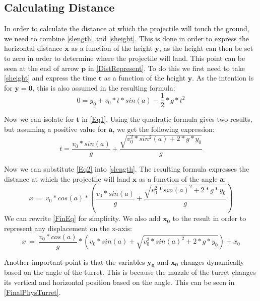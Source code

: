\subsection{Calculating Distance}\label{CalcDist}
In order to calculate the distance at which the projectile will touch the
ground, we need to combine \autoref{slength} and \autoref{sheight}. This is done in
order to express the horizontal distance $\mathbf{x}$ as a function of the
height $\mathbf{y}$, as the height can then be set to zero in order to determine
where the projectile will land. This point can be seen at the end of
arrow $\mathbf{p}$ in \autoref{DistRepresent}. To do this we first need to take
\autoref{sheight} and express the time $\mathbf{t}$ as a function of the height
$\mathbf{y}$. As the intention is for $\mathbf{y=0}$, this is also assumed in
the resulting formula:
\begin{equation}\label{Eq1}
0=y_0+v_0*t*sin(a)-\frac{1}{2}*g*t^2
\end{equation}

Now we can isolate for $\mathbf{t}$ in \autoref{Eq1}. Using the quadratic
formula gives two results, but assuming a positive value for $\mathbf{a}$, we
get the following expression:
\begin{equation}\label{Eq2}
t=\frac{v_0*sin(a)}{g}+\frac{\sqrt{v_0^2*sin^2(a)+2*g*y_0}}{g}
\end{equation}

Now we can substitute \autoref{Eq2} into \autoref{slength}. The resulting
formula expresses the distance at which the projectile will land $\mathbf{x}$ as
a function of the angle $\mathbf{a}$:
\begin{equation}\label{FinEq}
x\ =\ v_0*cos(a)* \left(\frac{v_0*sin(a)}{g} + \frac{
\sqrt{v_0^2*sin(a)^2+2*g*y_0}}{g}\right)
\end{equation}
We can rewrite \autoref{FinEq} for simplicity. We also add $\mathbf{x_0}$ to
the result in order to represent any displacement on the x-axis:
\begin{equation}\label{FinEq2}
x\ =\ \frac{v_0*cos(a)}{g}* \left(
v_0*sin(a)+\sqrt{v_0^2*sin(a)^2+2*g*y_0}\right)+x_0
\end{equation}

Another important point is that the variables $\mathbf{y_0}$ and $\mathbf{x_0}$
changes dynamically based on the angle of the turret. This is because the muzzle
of the turret changes its vertical and horizontal position based on the angle. This
can be seen in \autoref{FinalPhysTurret}.

